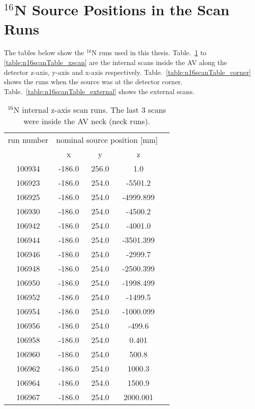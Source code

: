 \section{$^{16}$N Source Positions in the Scan Runs}\label{appendix:calibration}
The tables below show the $^{16}$N runs used in this thesis. Table.~\ref{table:n16scanTable_zscan} to \ref{table:n16scanTable_xscan} are the internal scans inside the AV along the detector z-axis, y-axis and x-axis respectively. Table.~\ref{table:n16scanTable_corner} shows the runs when the source was at the detector corner. Table.~\ref{table:n16scanTable_external} shows the external scans.
\begin{table}[ht]
		\caption[$^{16}$N internal z-axis scan runs.]{$^{16}$N internal z-axis scan runs. The last 3 scans were inside the AV neck (neck runs).\label{table:n16scanTable_zscan}}
				\vspace{2mm}
			\centering
	\begin{tabular*}{90mm}{c@{\extracolsep{\fill}}*4c}
		\toprule 
		run number  & \multicolumn{3}{c}{nominal source position [mm]}  \\
                                \cline{2-4}
			& x & y & z\\
		\midrule
		100934 & -186.0 & 256.0 & 1.0\\
        106923 & -186.0 & 254.0 & -5501.2\\
        106925 & -186.0 & 254.0 & -4999.899\\
        106930 & -186.0 & 254.0 & -4500.2\\
        106942 & -186.0 & 254.0 & -4001.0\\
        106944 & -186.0 & 254.0 & -3501.399\\
        106946 & -186.0 & 254.0 & -2999.7\\
        106948 & -186.0 & 254.0 & -2500.399\\
        106950 & -186.0 & 254.0 & -1998.499\\
        106952 & -186.0 & 254.0 & -1499.5\\
        106954 & -186.0 & 254.0 & -1000.099\\
        106956 & -186.0 & 254.0 & -499.6\\
        106958 & -186.0 & 254.0 & 0.401 \\
        106960 & -186.0 & 254.0 & 500.8\\
        106962 & -186.0 & 254.0 & 1000.3\\
        106964 & -186.0 & 254.0 & 1500.9\\
        106967 & -186.0 & 254.0 & 2000.001\\

\end{tabular*}
\end{table}

